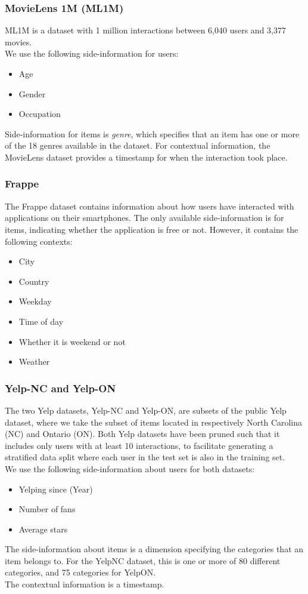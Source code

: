 \subsubsection*{MovieLens 1M (ML1M)}
ML1M is a dataset with 1 million interactions between 6,040 users and 3,377 movies.\\
We use the following side-information for users:
\begin{itemize}
    \item Age
    \item Gender
    \item Occupation
\end{itemize}
Side-information for items is \textit{genre}, which specifies that an item has one or more of the 18 genres available in the dataset.
For contextual information, the MovieLens dataset provides a timestamp for when the interaction took place.

\subsubsection*{Frappe}
The Frappe dataset contains information about how users have interacted with applications on their smartphones.
The only available side-information is for items, indicating whether the application is free or not.
However, it contains the following contexts:
\begin{itemize}
    \item City
    \item Country
    \item Weekday
    \item Time of day
    \item Whether it is weekend or not
    \item Weather
\end{itemize}

\subsubsection*{Yelp-NC and Yelp-ON}
The two Yelp datasets, Yelp-NC and Yelp-ON, are subsets of the public Yelp dataset, where we take the subset of items located in respectively North Carolina (NC) and Ontario (ON).
Both Yelp datasets have been pruned such that it includes only users with at least 10 interactions, to facilitate generating a stratified data split where each user in the test set is also in the training set.\\
We use the following side-information about users for both datasets:
\begin{itemize}
    \item Yelping since (Year)
    \item Number of fans
    \item Average stars
\end{itemize}
The side-information about items is a dimension specifying the categories that an item belongs to.
For the YelpNC dataset, this is one or more of 80 different categories, and 75 categories for YelpON.\\
The contextual information is a timestamp.

